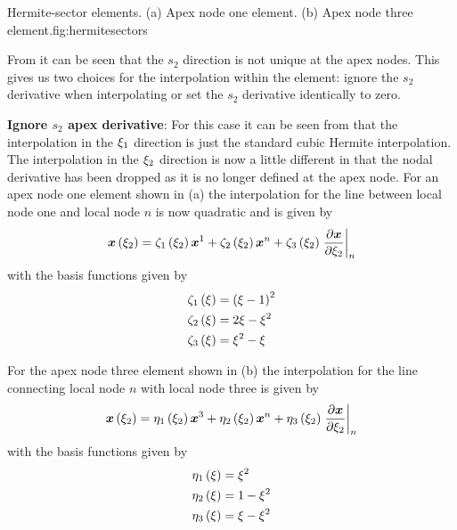 {Hermite-sector elements. (a) Apex node one element. (b) Apex node three
  element.}{fig:hermitesectors}

From  it can be seen that the $s_{2}$ direction is
not unique at the apex nodes. This gives us two choices for the interpolation
within the element: ignore the $s_{2}$ derivative when interpolating or set
the $s_{2}$ derivative identically to zero.

\textbf{Ignore $s_{2}$ apex derivative}: For this case it can be seen from
 that the interpolation in the $\xi_{1}$ direction
is just the standard cubic Hermite interpolation. The interpolation in the
$\xi_{2}$ direction is now a little different in that the nodal \arclen
derivative has been dropped as it is no longer defined at the apex node.  For
an apex node one element shown in (a) the
interpolation for the line between local node one and local node $n$ is now
quadratic and is given by
\begin{equation}
  \fnof{\vect{x}}{\xitwo}=\hsonebfn{1}{\xitwo}\nodept{\vect{x}}{1}+
  \hsonebfn{2}{\xitwo}\nodept{\vect{x}}{n}+
  \hsonebfn{3}{\xitwo}\evalat{\delby{\vect{x}}{\xitwo}}{n}
  \label{eqn:hsapex1xiinterp}
\end{equation}
with the basis functions given by
\begin{equation}
  \begin{split}
       \zeta_{1} \left( \xi \right)  &=\left( \xi-1 \right)^{2} \\ 
       \zeta_{2} \left( \xi \right)  &=2\xi-\xi^{2} \\
       \zeta_{3} \left( \xi \right)  &=\xi^{2}-\xi
  \end{split}
  \label{eqn:hsapex1bfuns}
\end{equation}

For the apex node three element shown in (b) the
interpolation for the line connecting local node $n$ with local node three is
given by
\begin{equation}
  \fnof{\vect{x}}{\xitwo}=\hsthreebfn{1}{\xitwo}\nodept{\vect{x}}{3}+
  \hsthreebfn{2}{\xitwo}\nodept{\vect{x}}{n}+
  \hsthreebfn{3}{\xitwo}\evalat{\delby{\vect{x}}{\xitwo}}{n}
  \label{eqn:hsapex3xiinterp}
\end{equation}
with the basis functions given by
\begin{equation}
  \begin{split}
       \eta_{1} \left( \xi \right)  &=\xi^{2} \\ 
       \eta_{2} \left( \xi \right)  &=1-\xi^{2} \\ 
       \eta_{3} \left( \xi \right)  &=\xi-\xi^{2}
  \end{split}
  \label{eqn:hsapex3Bfuns}
\end{equation}
 
